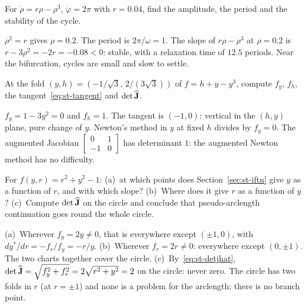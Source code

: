 \label{exo:st-hopfshort}
%
For $\dot\rho = r\rho - \rho^3$, $\dot\varphi = 2\pi$ with $r = 0.04$, find the
amplitude, the period and the stability of the cycle.
\begin{solution}
$\rho^2 = r$ gives $\rho = 0.2$. The period is $2\pi/\omega = 1$. The slope of
$r\rho - \rho^3$ at $\rho = 0.2$ is $r - 3\rho^2 = -2r = -0.08 < 0$: stable, with a
relaxation time of $12.5$ periods. Near the bifurcation, cycles are small and slow
to settle.
\end{solution}

\label{exo:st-newton}
%
At the fold $(y,h) = (-1/\sqrt3,\, 2/(3\sqrt3))$ of $f = h + y - y^3$, compute $f_y$,
$f_h$, the tangent~\eqref{eq:st-tangent} and $\det\widehat{\mathbf{J}}$.
\begin{solution}
$f_y = 1 - 3y^2 = 0$ and $f_h = 1$. The tangent is $(-1, 0)$: vertical in the
$(h,y)$ plane, pure change of $y$. Newton's method in $y$ at fixed $h$ divides by
$f_y = 0$. The augmented Jacobian
$\begin{bmatrix} 0 & 1\\ -1 & 0\end{bmatrix}$ has determinant $1$: the augmented
Newton method has no difficulty.
\end{solution}

\label{exo:st-circle}
%
For $f(y,r) = r^2 + y^2 - 1$: (a)~at which points does Section~\ref{sec:st-iftn} give
$y$ as a function of $r$, and with which slope? (b)~Where does it give $r$ as a
function of $y$? (c)~Compute $\det\widehat{\mathbf{J}}$ on the circle and conclude that
pseudo-arclength continuation goes round the whole circle.
\begin{solution}
(a)~Wherever $f_y = 2y \neq 0$, that is everywhere except $(\pm1,0)$, with
$dy^*/dr = -f_r/f_y = -r/y$. (b)~Wherever $f_r = 2r \neq 0$: everywhere except
$(0,\pm1)$. The two charts together cover the circle. (c)~By~\eqref{eq:st-detjhat},
$\det\widehat{\mathbf{J}} = \sqrt{f_y^2 + f_r^2} = 2\sqrt{r^2 + y^2} = 2$ on the circle:
never zero. The circle has two folds in $r$ (at $r = \pm1$) and none is a problem for
the arclength; there is no branch point.
\end{solution}


